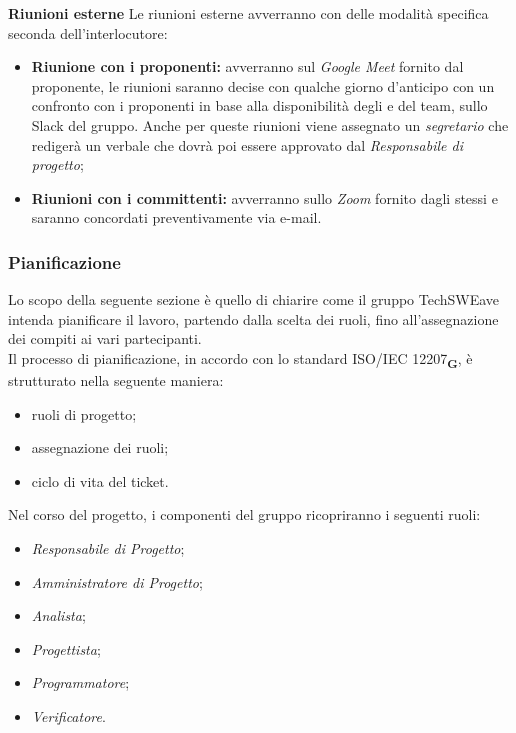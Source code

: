 \textbf{Riunioni esterne}
Le riunioni esterne avverranno con delle modalità specifica seconda dell'interlocutore:
\begin{itemize}
    \item \textbf{Riunione con i proponenti: } avverranno sul \textit{Google Meet} fornito dal proponente, le riunioni saranno decise con qualche giorno d'anticipo con un confronto con i proponenti in base alla disponibilità degli e del team, sullo Slack del gruppo. Anche per queste riunioni viene assegnato un \textit{segretario} che redigerà un verbale che dovrà poi essere approvato dal \textit{Responsabile di progetto};
    \item \textbf{Riunioni con i committenti:} avverranno sullo \textit{Zoom} fornito dagli stessi e saranno concordati preventivamente via e-mail.
\end{itemize}
\subsubsection{Pianificazione}
Lo scopo della seguente sezione è quello di chiarire come il gruppo TechSWEave intenda pianificare il lavoro, partendo dalla scelta dei ruoli, fino all'assegnazione dei compiti ai vari partecipanti.\\
Il processo di pianificazione, in accordo con lo standard ISO/IEC 12207\textsubscript{\textbf{G}}, è strutturato nella seguente maniera:
\begin{itemize}
    \item ruoli di progetto;
    \item assegnazione dei ruoli;
    \item ciclo di vita del ticket.
\end{itemize}
Nel corso del progetto, i componenti del gruppo ricopriranno i seguenti ruoli:
\begin{itemize}
    \item \textit{Responsabile di Progetto};
    \item \textit{Amministratore di Progetto};
    \item \textit{Analista};
    \item \textit{Progettista};
    \item \textit{Programmatore};
    \item \textit{Verificatore}.
\end{itemize}

